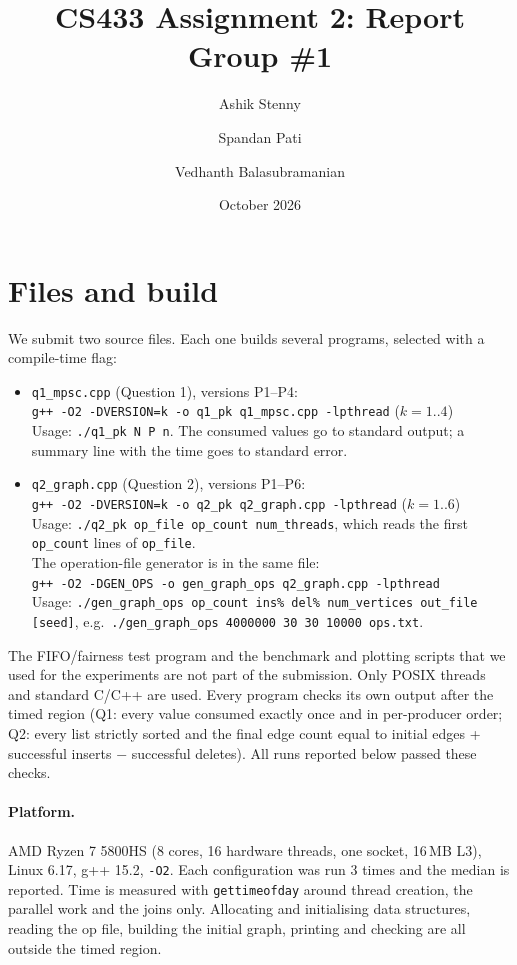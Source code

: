 \documentclass[10pt,a4paper]{article}
\title{CS433 Assignment 2: Report\\\large Group \#1}
\author{Ashik Stenny \and Spandan Pati \and Vedhanth Balasubramanian}
\date{October 2026}
\begin{document}
\maketitle

\section*{Files and build}
We submit two source files. Each one builds several programs, selected with a compile-time flag:
\begin{itemize}
\item \texttt{q1\_mpsc.cpp} (Question 1), versions P1--P4:\\
      \texttt{g++ -O2 -DVERSION=k -o q1\_pk q1\_mpsc.cpp -lpthread} \quad ($k = 1..4$)\\
      Usage: \texttt{./q1\_pk N P n}. The consumed values go to standard output; a summary line with the time goes to standard error.
\item \texttt{q2\_graph.cpp} (Question 2), versions P1--P6:\\
      \texttt{g++ -O2 -DVERSION=k -o q2\_pk q2\_graph.cpp -lpthread} \quad ($k = 1..6$)\\
      Usage: \texttt{./q2\_pk op\_file op\_count num\_threads}, which reads the first \texttt{op\_count} lines of \texttt{op\_file}.\\
      The operation-file generator is in the same file:\\
      \texttt{g++ -O2 -DGEN\_OPS -o gen\_graph\_ops q2\_graph.cpp -lpthread}\\
      Usage: \texttt{./gen\_graph\_ops op\_count ins\% del\% num\_vertices out\_file [seed]}, e.g.\ \texttt{./gen\_graph\_ops 4000000 30 30 10000 ops.txt}.
\end{itemize}
The FIFO/fairness test program and the benchmark and plotting scripts that we used for the experiments are not part of the submission.
Only POSIX threads and standard C/C++ are used. Every program checks its own output after the timed region
(Q1: every value consumed exactly once and in per-producer order; Q2: every list strictly sorted and
the final edge count equal to initial edges + successful inserts $-$ successful deletes). All runs reported below passed these checks.

\paragraph{Platform.} AMD Ryzen 7 5800HS (8 cores, 16 hardware threads, one socket, 16\,MB L3), Linux 6.17, g++ 15.2, \texttt{-O2}.
Each configuration was run 3 times and the median is reported. Time is measured with \texttt{gettimeofday} around thread creation,
the parallel work and the joins only. Allocating and initialising data structures, reading the op file, building the initial graph,
printing and checking are all outside the timed region.
\end{document}
